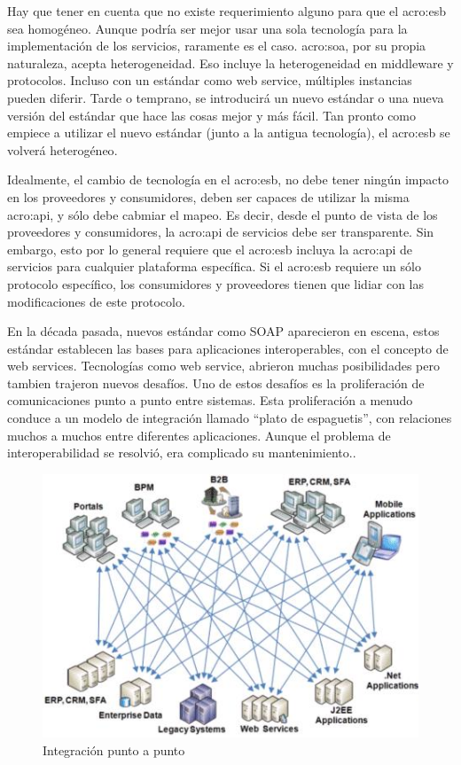 Hay que tener en cuenta que no existe requerimiento alguno para que el \gls{acro:esb} sea homogéneo.  Aunque podría ser mejor usar una sola tecnología para la implementación de los servicios, raramente es el caso. \gls{acro:soa}, por su propia naturaleza, acepta heterogeneidad. Eso incluye la heterogeneidad en middleware y protocolos. Incluso con un estándar como web service, múltiples instancias pueden diferir.  Tarde o temprano, se introducirá un nuevo estándar o una nueva versión del estándar que hace las cosas mejor y más fácil. Tan pronto como empiece a utilizar el nuevo estándar (junto a la antigua tecnología), el \gls{acro:esb} se volverá heterogéneo\cite[p.~49]{josuttis2007}.

Idealmente, el cambio de tecnología en el \gls{acro:esb}, no debe tener ningún impacto en los proveedores y consumidores, deben ser capaces de utilizar la misma \gls{acro:api}, y sólo debe cabmiar el mapeo.
Es decir, desde el punto de vista de los proveedores y consumidores, la \gls{acro:api} de servicios debe ser transparente. Sin embargo, esto por lo general requiere que el \gls{acro:esb} incluya la \gls{acro:api} de servicios para cualquier plataforma específica. Si el \gls{acro:esb} requiere un sólo protocolo específico, los consumidores y proveedores tienen que lidiar con las modificaciones de este protocolo\cite[p.~50]{josuttis2007}.


En la década pasada, nuevos estándar como SOAP aparecieron en escena, estos estándar establecen las bases para aplicaciones interoperables, con el concepto de web services.
Tecnologías como web service, abrieron muchas posibilidades pero tambien trajeron nuevos desafíos.  Uno de estos desafíos es la proliferación de comunicaciones punto a punto entre sistemas.  Esta proliferación a menudo conduce a un modelo de integración llamado ``plato de espaguetis'', con relaciones muchos a muchos entre diferentes aplicaciones.
Aunque el problema de interoperabilidad se resolvió, era complicado su mantenimiento.\cite[p.~4]{dossotandemic2010}.

\begin{figure}[H]
  \includegraphics[width=\linewidth]{src/images/02-capitulo-2/tecnologias/esb/point-to-point-integration.png}
  \caption{Integración punto a punto}
  \label{fig:point-to-point-integration}
\end{figure}


